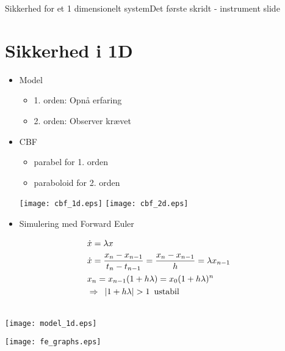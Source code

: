 \begin{frame}{Sikkerhed for et 1 dimensionelt system}{Det første skridt - instrument slide}
\section{Sikkerhed i 1D}
\vspace*{-0.5cm}
\begin{minipage}{0.6\textwidth}
\begin{block}{}
	\begin{itemize}
		\item Model
		\begin{itemize}
			\item 1. orden: Opnå erfaring
			\item 2. orden: Observer krævet
		\end{itemize}
		\item CBF
		\begin{itemize}
			\item parabel for 1. orden
			\item paraboloid for 2. orden
		\end{itemize}
			\texttt{[image: cbf\_1d.eps]} \hspace{0.2cm}
			\texttt{[image: cbf\_2d.eps]}
		\item Simulering med Forward Euler
	\end{itemize}
\end{block}
\vspace{-0.7cm}
\scriptsize
\begin{align*}
&\scriptsize \dot{x} = \lambda x \nonumber \\
&\dot{x} = \frac{x_n - x_{n-1}}{t_n - t_{n-1}} = \frac{x_n - x_{n-1}}{h} = \lambda x_{n-1}  \\
& x_n = x_{n-1}(1+h\lambda) = x_0(1+h\lambda)^n \\
&\Rightarrow \,\,\, |1+h\lambda| > 1 \,\,\,\text{ustabil} 
\end{align*}
\end{minipage}
\hspace{0.3cm}
\begin{minipage}{0.35\textwidth}
{\color{white}{white}}\\
{\color{white}{white}}
\hspace*{-0.5cm}
\texttt{[image: model\_1d.eps]}

\hspace*{-0.5cm}
\texttt{[image: fe\_graphs.eps]}

\end{minipage}
\end{frame}


